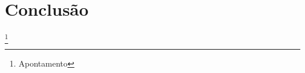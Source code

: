 \newpage
\section{Conclusão}
\newpage
%
%
\listoffigures
\cite{*}

\newpage
\footnote{Apontamento}

\begin{comment}
Vamos montar uma empresa, eu monto e tu vais ser a empresa.\\
Um palerma nasce a cada minuto.\\

\end{comment}
